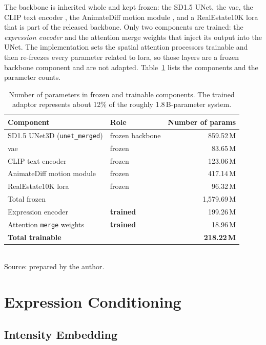 The backbone is inherited whole and kept frozen: the SD1.5 UNet, the \gls{vae}, the CLIP text encoder
\citep{radford2021clip}, the AnimateDiff motion module \citep{guo2024animatediff}, and a RealEstate10K 
\gls{lora} \citep{hu2022lora} that is part of the released backbone.
Only two components are trained: the \emph{expression encoder} and the attention
merge weights that inject its output into the UNet. The implementation sets the
spatial attention processors trainable and then re-freezes every parameter related to \gls{lora}, so those layers are a frozen backbone component and are not adapted. Table~\ref{tab:method-components} lists the components and the parameter
counts.

\begin{table}[t]
\centering
\caption{Number of parameters in frozen and trainable components. The trained adaptor represents about 12\% of the roughly 1.8\,B-parameter system.}
\label{tab:method-components}
\begin{tabular}{llr}
\toprule
Component & Role & Number of params \\
\midrule
SD1.5 UNet3D (\texttt{unet\_merged}) & frozen backbone & 859.52\,M \\
\gls{vae} & frozen & \phantom{0}83.65\,M \\
CLIP text encoder & frozen & 123.06\,M \\
AnimateDiff motion module & frozen & 417.14\,M \\
RealEstate10K \gls{lora} & frozen & \phantom{0}96.32\,M \\
\midrule
Total frozen & & 1{,}579.69\,M \\
\midrule
Expression encoder & \textbf{trained} & 199.26\,M \\
Attention \texttt{merge} weights & \textbf{trained} & \phantom{0}18.96\,M \\
\midrule
\textbf{Total trainable} & & \textbf{218.22\,M} \\
\bottomrule
\end{tabular}\\[4pt]
{\footnotesize Source: prepared by the author.}
\end{table}

\section{Expression Conditioning}\label{sec:method-conditioning}

\subsection{Intensity Embedding}\label{subsec:method-embedding}

